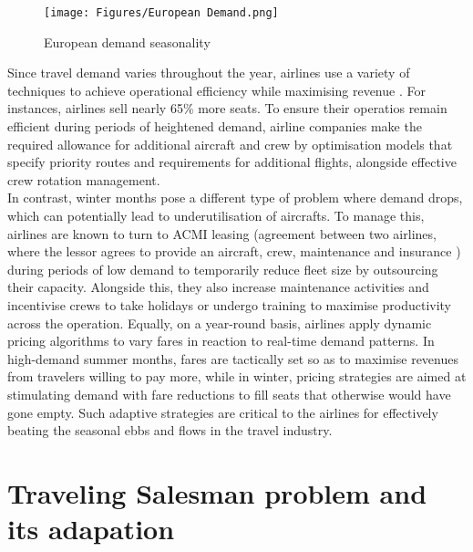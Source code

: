 \begin{figure}[!ht]
    \centering
    \texttt{[image: Figures/European Demand.png]}
    \caption{European demand seasonality \cite{flight_seasonnality_challenges}}
    \label{fig:European_demand_seasonality}
\end{figure}


Since travel demand varies throughout the year, airlines use a variety of techniques to achieve operational efficiency while maximising revenue \cite{flight_seasonnality_challenges}. For instances, airlines sell nearly 65\% more seats. To ensure their operatios remain efficient during periods of heightened demand, airline companies make the required allowance for additional aircraft and crew by optimisation models that specify priority routes and requirements for additional flights, alongside effective crew rotation management.
\\In contrast, winter months pose a different type of problem where demand drops, which can potentially lead to underutilisation of aircrafts. To manage this, airlines are known to turn to ACMI leasing (agreement between two airlines, where the lessor agrees to provide an aircraft, crew, maintenance and insurance \cite{acmi_def}) during periods of low demand to temporarily reduce fleet size by outsourcing their capacity. Alongside this, they also increase maintenance activities and incentivise crews to take holidays or undergo training to maximise productivity across the operation. Equally, on a year-round basis, airlines apply dynamic pricing algorithms to vary fares in reaction to real-time demand patterns. In high-demand summer months, fares are tactically set so as to maximise revenues from travelers willing to pay more, while in winter, pricing strategies are aimed at stimulating demand with fare reductions to fill seats that otherwise would have gone empty. Such adaptive strategies are critical to the airlines for effectively beating the seasonal ebbs and flows in the travel industry.




\newpage
\section{Traveling Salesman problem and its adapation}
\label{sec:TSP}

